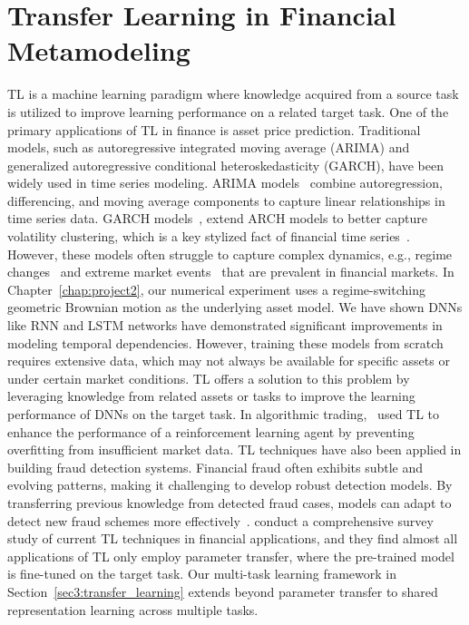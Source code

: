 \section{Transfer Learning in Financial Metamodeling} \label{sec3:background}

TL is a machine learning paradigm where knowledge acquired from a source task is utilized to improve learning performance on a related target task.
One of the primary applications of TL in finance is asset price prediction. 
Traditional models, such as autoregressive integrated moving average (ARIMA) and generalized autoregressive conditional heteroskedasticity (GARCH), have been widely used in time series modeling.
ARIMA models~\citep{box1970distribution} combine autoregression, differencing, and moving average components to capture linear relationships in time series data.
GARCH models~\citep{bollerslev1990modelling}, extend ARCH models to better capture volatility clustering, which is a key stylized fact of financial time series~\citep{cont2001empirical}.
However, these models often struggle to capture complex dynamics, e.g., regime changes~\citep{hamilton1989new} and extreme market events~\citep{embrechts2013modelling} that are prevalent in financial markets.
In Chapter~\ref{chap:project2}, our numerical experiment uses a regime-switching geometric Brownian motion as the underlying asset model.
We have shown DNNs like RNN and LSTM networks have demonstrated significant improvements in modeling temporal dependencies. 
However, training these models from scratch requires extensive data, which may not always be available for specific assets or under certain market conditions.
TL offers a solution to this problem by leveraging knowledge from related assets or tasks to improve the learning performance of DNNs on the target task.
In algorithmic trading,~\cite{jeong2019improving} used TL to enhance the performance of a reinforcement learning agent by preventing overfitting from insufficient market data.
TL techniques have also been applied in building fraud detection systems. 
Financial fraud often exhibits subtle and evolving patterns, making it challenging to develop robust detection models.
By transferring previous knowledge from detected fraud cases, models can adapt to detect new fraud schemes more effectively~\citep{lebichot2021transfer}.
\cite{yan2024comprehensive} conduct a comprehensive survey study of current TL techniques in financial applications, and they find almost all applications of TL only employ parameter transfer, where the pre-trained model is fine-tuned on the target task.
Our multi-task learning framework in Section~\ref{sec3:transfer_learning} extends beyond parameter transfer to shared representation learning across multiple tasks.

